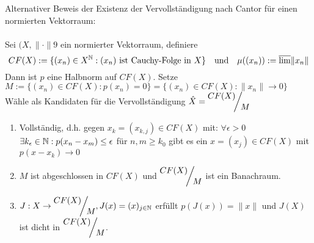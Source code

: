 \begin{bemerkung}
Alternativer Beweis der Existenz der Vervollständigung nach Cantor für einen normierten Vektorraum: \\ \\
	Sei $(X, \| \cdot \|9$ ein normierter Vektorraum, definiere 
	\[ CF(X) := \{ (x_{n}) \in X^{\mathbb{N}}: (x_{n}) \text{ ist Cauchy-Folge in } X \} \quad \text{und} \quad \mu((x_{n})) := \overline{\lim} \| x_{n} \| \]
	Dann ist $p$ eine Halbnorm auf $CF(X)$. Setze $M := \{(x_{n}) \in CF(X): p(x_{n}) = 0 \} = \{ (x_{n}) \in CF(X): \| x_{n} \| \rightarrow 0 \}$
	Wähle als Kandidaten für die Vervollständigung $\hat X = \QR{CF(X)}{M}$
	\begin{enumerate}[label=\roman*\upshape)]
		\item Vollständig, d.h. gegen $x_{k} = (x_{k, j}) \in CF(X)$ mit: $\forall \epsilon > 0$ $\exists k_{\epsilon} \in \mathbb{N}: p(x_{n} - x_{m}) \leq \epsilon$ für $n, m \geq k_{0}$ gibt es ein $x = (x_{j}) \in CF(X)$ mit $p(x - x_{k}) \rightarrow 0$
		\item $M$ ist abgeschlossen in $CF(X)$ und $\QR{CF(X)}{M}$ ist ein Banachraum.
		\item $J: X \rightarrow \QR{CF(X)}{M}, J(x) = (x)_{j \in \MdN}$ erfüllt $p\left(J(x)\right) = \| x \|$ und $J(X)$ ist dicht in $\QR{CF(X)}{M}$.
	\end{enumerate} 
\end{bemerkung}

